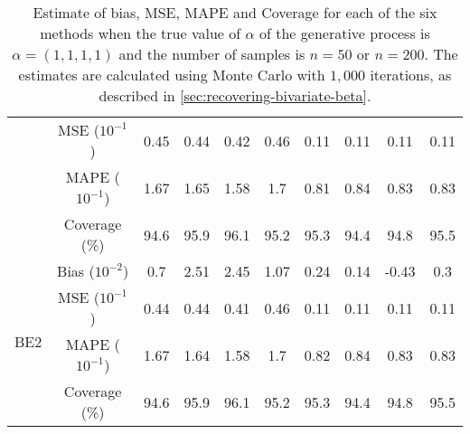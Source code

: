 \begin{table}[htbp]
\begin{tabular}{c|c|cccc|cccc}
& MSE ($10^{-1}$)  & 0.45 & 0.44 & 0.42 & 0.46 & 0.11 & 0.11 & 0.11 & 0.11 \\ 
& MAPE ($10^{-1}$)  & 1.67 & 1.65 & 1.58 & 1.7 & 0.81 & 0.84 & 0.83 & 0.83 \\ 
& Coverage (\%)  & 94.6 & 95.9 & 96.1 & 95.2 & 95.3 & 94.4 & 94.8 & 95.5 \\ 
\hline 
\multirow{4}{*}{BE2}& Bias ($10^{-2}$)  & 0.7 & 2.51 & 2.45 & 1.07 & 0.24 & 0.14 & -0.43 & 0.3 \\ 
& MSE ($10^{-1}$)  & 0.44 & 0.44 & 0.41 & 0.46 & 0.11 & 0.11 & 0.11 & 0.11 \\ 
& MAPE ($10^{-1}$)  & 1.67 & 1.64 & 1.58 & 1.7 & 0.82 & 0.84 & 0.83 & 0.83 \\ 
& Coverage (\%)  & 94.6 & 95.9 & 96.1 & 95.2 & 95.3 & 94.4 & 94.8 & 95.5 \\ 
\end{tabular}
\caption{\label{tab:alpha-experiment1}Estimate of bias, MSE, MAPE and Coverage for each of the six methods when the true value of $\alpha$ of the generative process is $\alpha = (1,1,1,1)$ and the number of samples is $n=50$ or $n=200$. 
The estimates are calculated using Monte Carlo with $1,000$ iterations, as described in \autoref{sec:recovering-bivariate-beta}.}
\end{table}